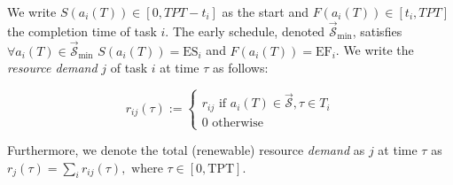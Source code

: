 \documentclass[preprint,
3p]{elsarticle} %
\begin{document}
\begin{appendices}
We write \(S(a_i(T))\in [0,TPT-t_i]\) as the start and
\(F(a_i(T)) \in [t_i,TPT]\) the completion time of task \(i\). The early
schedule, denoted \(\overrightarrow{\mathcal{S}}_{\min}\), satisfies
\(\forall a_i(T)\in \overrightarrow{\mathcal{S}}_{\min}\)
\(S(a_i(T))=\text{ES}_i\) and \(F(a_i(T))=\text{EF}_i\). We write the
\emph{resource demand} \(j\) of task \(i\) at time \(\tau\) as follows:

\begin{equation}
\label{eq:r_ij}
r_{ij}(\tau):=\begin{cases}r_{ij}\text{ if } a_i(T)\in \overrightarrow{\mathcal{S}}, \tau \in T_i \\
0\text{ otherwise}\end{cases}   
\end{equation}

Furthermore, we denote the total (renewable) resource \emph{demand} as
\(j\) at time \(\tau\) as
\(r_j(\tau)=\sum_ir_{ij}(\tau), \text{ where } \tau \in [0,\text{TPT}]\).


\end{appendices}
\end{document}
